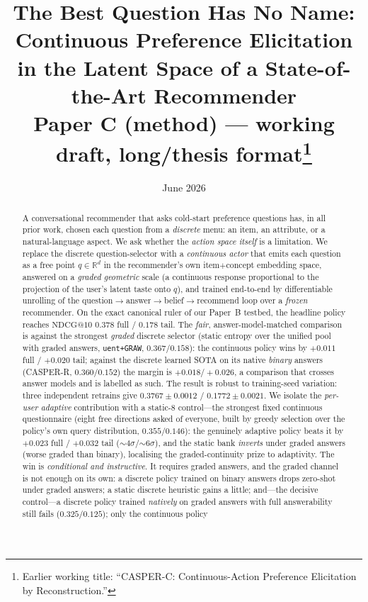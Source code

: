 \documentclass[11pt]{article}
\title{\textbf{The Best Question Has No Name:\\Continuous Preference Elicitation in the Latent Space of a State-of-the-Art Recommender}\\[4pt]
\large Paper C (method) --- working draft, long/thesis format\thanks{Earlier working title: ``CASPER-C: Continuous-Action Preference Elicitation by Reconstruction.''}}
\author{}
\date{June 2026}
\newcommand{\R}{\mathbb{R}}
\begin{document}
\maketitle

\begin{abstract}
\noindent A conversational recommender that asks cold-start preference questions has, in all prior work, chosen each
question from a \emph{discrete} menu: an item, an attribute, or a natural-language aspect. We ask whether the
\emph{action space itself} is a limitation. We replace the discrete question-selector with a \emph{continuous actor}
that emits each question as a free point $q\in\R^{d}$ in the recommender's own item$+$concept embedding space, answered
on a \emph{graded geometric} scale (a continuous response proportional to the projection of the user's latent taste onto
$q$), and trained end-to-end by differentiable unrolling of the question$\to$answer$\to$belief$\to$recommend loop over a
\emph{frozen} recommender. On the exact canonical ruler of our Paper~B testbed, the headline policy reaches
$\mathrm{NDCG@10}$ $0.378$ full / $0.178$ tail. The \emph{fair}, answer-model-matched comparison is against the
strongest \emph{graded} discrete selector (static entropy over the unified pool with graded answers,
\texttt{uent+GRAW}, $0.367/0.158$): the continuous policy wins by $+0.011$ full / $+0.020$ tail; against the discrete
learned SOTA on its native \emph{binary} answers (CASPER-R, $0.360/0.152$) the margin is $+0.018/+0.026$, a comparison
that crosses answer models and is labelled as such. The result is robust to training-seed variation: three independent
retrains give $0.3767\pm0.0012$ / $0.1772\pm0.0021$. We isolate the \emph{per-user adaptive} contribution with a
static-8 control---the strongest fixed continuous questionnaire (eight free directions asked of everyone, built by greedy
selection over the policy's own query distribution, $0.355/0.146$): the genuinely adaptive policy beats it by $+0.023$
full / $+0.032$ tail (${\sim}4\sigma$/${\sim}6\sigma$), and the static bank \emph{inverts} under graded answers (worse
graded than binary), localising the graded-continuity prize to adaptivity. The win is \emph{conditional and instructive}. It requires graded
answers, and the graded channel is not enough on its own: a discrete policy trained on binary answers drops zero-shot
under graded answers; a static discrete heuristic gains a little; and---the decisive control---a discrete policy trained
\emph{natively} on graded answers with full answerability still fails ($0.325/0.125$); only the continuous policy

\end{abstract}
\end{document}
